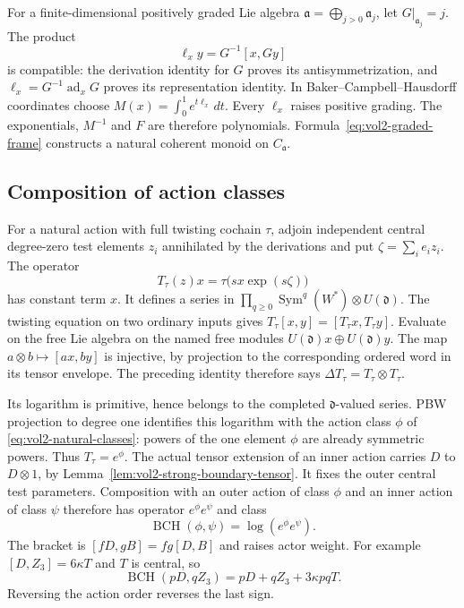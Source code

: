For a finite-dimensional positively graded Lie algebra
$\mathfrak a=\bigoplus_{j>0}\mathfrak a_j$, let
$G|_{\mathfrak a_j}=j$. The product
\begin{equation}\label{eq:vol2-positive-product}
 \ell_xy=G^{-1}[x,Gy]
\end{equation}
is compatible: the derivation identity for $G$ proves its
antisymmetrization, and
$\ell_x=G^{-1}\operatorname{ad}_xG$ proves its representation
identity. In Baker--Campbell--Hausdorff coordinates choose
$M(x)=\int_0^1e^{t\ell_x}\,dt$. Every $\ell_x$ raises
positive grading. The exponentials, $M^{-1}$ and $F$ are
therefore polynomials. Formula~\eqref{eq:vol2-graded-frame}
constructs a natural coherent monoid on $C_{\mathfrak a}$.

\subsection{Composition of action classes}

For a natural action with full twisting cochain $\tau$,
adjoin independent central degree-zero test elements $z_i$
annihilated by the derivations and put $\zeta=\sum_i e_i z_i$.
The operator
\[
 T_\tau(z)x=\tau\bigl(sx\exp(s\zeta)\bigr)
\]
has constant term $x$. It defines a series in
$\prod_{q\geq0}\operatorname{Sym}^q(W^*)\otimes U(\mathfrak d)$.
The twisting equation on two ordinary inputs gives
$T_\tau[x,y]=[T_\tau x,T_\tau y]$. Evaluate on the free
Lie algebra on the named free modules
$U(\mathfrak d)x\oplus U(\mathfrak d)y$. The map
$a\otimes b\mapsto[ax,by]$ is injective, by projection to
the corresponding ordered word in its tensor envelope.
The preceding identity therefore says
$\Delta T_\tau=T_\tau\otimes T_\tau$.

Its logarithm is primitive, hence belongs to the completed
$\mathfrak d$-valued series. PBW projection to degree one
identifies this logarithm with the action class $\phi$ of
\eqref{eq:vol2-natural-classes}: powers of the one element
$\phi$ are already symmetric powers. Thus $T_\tau=e^\phi$.
The actual tensor extension of an inner action carries
$D$ to $D\otimes1$, by
Lemma~\ref{lem:vol2-strong-boundary-tensor}. It fixes the
outer central test parameters. Composition with an outer
action of class $\phi$ and an inner action of class $\psi$
therefore has operator $e^\phi e^\psi$ and class
\begin{equation}\label{eq:vol2-action-BCH}
 \operatorname{BCH}(\phi,\psi)=\log(e^\phi e^\psi).
\end{equation}
The bracket is $[fD,gB]=fg[D,B]$ and raises actor weight.
For example $[D,Z_3]=6\kappa T$ and $T$ is central, so
\[
 \operatorname{BCH}(pD,qZ_3)=pD+qZ_3+3\kappa pqT.
\]
Reversing the action order reverses the last sign.

